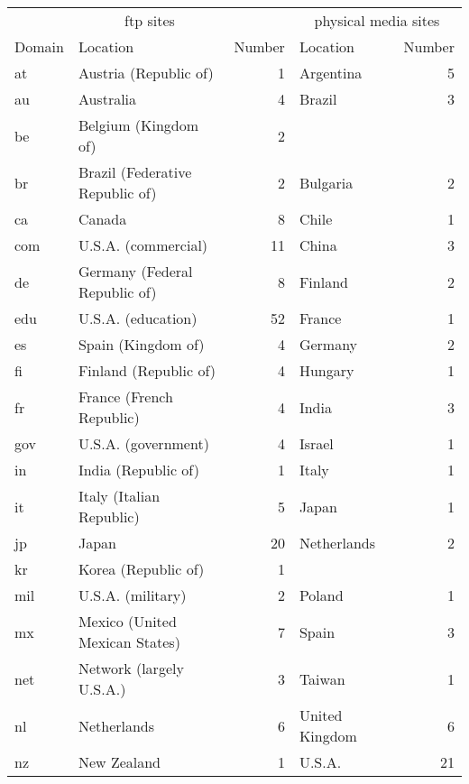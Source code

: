 \begin{center}
\begin{tabular}{|llr|lr|} \hline\hline
\multicolumn{3}{|c|}{ftp sites}&\multicolumn{2}{c|}{physical media sites} \\
Domain & Location &                     Number & Location &           Number  \\
\hline
at  & Austria (Republic of)         &  1 & Argentina      &  5  \\
au  & Australia                     &  4 & Brazil         &  3  \\
be  & Belgium (Kingdom of)          &  2 &                &     \\
br  & Brazil  (Federative Republic of) &  2 & Bulgaria       &  2  \\
ca  & Canada                        &  8 & Chile          &  1  \\
com & U.S.A. (commercial)           & 11 & China          &  3  \\
de  & Germany (Federal Republic of) &  8 & Finland        &  2  \\
edu & U.S.A. (education)            & 52 & France         &  1  \\
es  & Spain (Kingdom of)            &  4 & Germany        &  2  \\
fi  & Finland (Republic of)         &  4 & Hungary        &  1  \\
fr  & France (French Republic)      &  4 & India          &  3  \\
gov & U.S.A. (government)           &  4 & Israel         &  1  \\
in  & India (Republic of)           &  1 & Italy          &  1  \\
it  & Italy (Italian Republic)      &  5 & Japan          &  1  \\
jp  & Japan                         & 20 & Netherlands    &  2  \\
kr  & Korea (Republic of)           &  1 &                &     \\
mil & U.S.A. (military)             &  2 & Poland         &  1  \\
mx  & Mexico (United Mexican States)&  7 & Spain          &  3  \\
net & Network (largely U.S.A.)      &  3 & Taiwan         &  1  \\
nl  & Netherlands                   &  6 & United Kingdom &  6  \\
nz  & New Zealand                   &  1 & U.S.A.         & 21  \\

\end{tabular}
\end{center}
